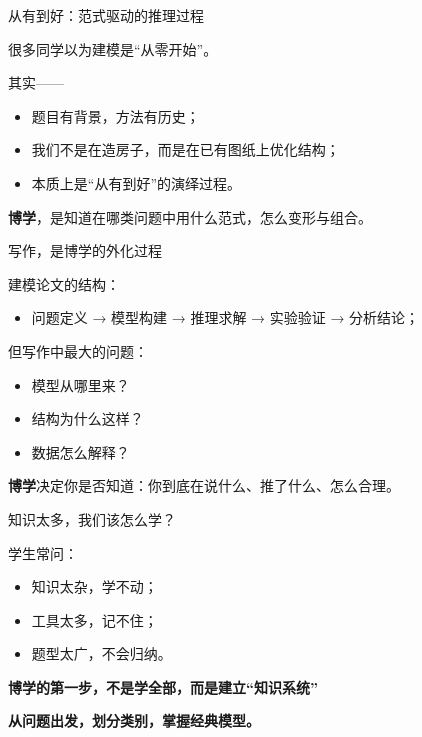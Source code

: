 \begin{frame}{\color{techwhite}从有到好：范式驱动的推理过程}
\justifying
{\color{techwhite}
很多同学以为建模是“从零开始”。

其实——
\begin{itemize}
  \item 题目有背景，方法有历史；
  \item 我们不是在造房子，而是在已有图纸上优化结构；
  \item 本质上是“从有到好”的演绎过程。
\end{itemize}

\vspace{0.5em}
\textbf{博学}，是知道在哪类问题中用什么范式，怎么变形与组合。
}
\end{frame}

\begin{frame}{\color{techwhite}写作，是博学的外化过程}
\justifying
{\color{techwhite}
建模论文的结构：
\begin{itemize}
  \item 问题定义 → 模型构建 → 推理求解 → 实验验证 → 分析结论；
\end{itemize}

但写作中最大的问题：
\begin{itemize}
  \item 模型从哪里来？
  \item 结构为什么这样？
  \item 数据怎么解释？
\end{itemize}

\textbf{博学}决定你是否知道：你到底在说什么、推了什么、怎么合理。
}
\end{frame}

\begin{frame}{\color{techwhite}知识太多，我们该怎么学？}
\justifying
{\color{techwhite}
学生常问：

\vspace{0.5em}
\begin{itemize}
  \item 知识太杂，学不动；
  \item 工具太多，记不住；
  \item 题型太广，不会归纳。
\end{itemize}

\vspace{0.5em}
\textbf{博学的第一步，不是学全部，而是建立“知识系统”}

\centering
\textbf{从问题出发，划分类别，掌握经典模型。}
}
\end{frame}

